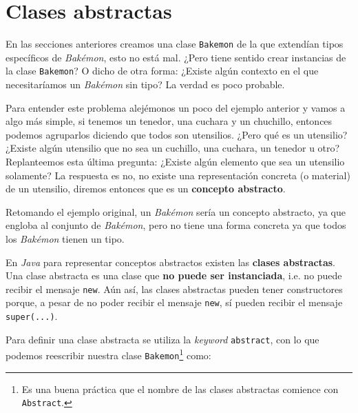 \section{Clases abstractas}
  En las secciones anteriores creamos una clase \texttt{Bakemon} de la que extendían tipos 
  específicos de \textit{Bakémon}, esto no está mal.
  ¿Pero tiene sentido crear instancias de la clase \texttt{Bakemon}?
  O dicho de otra forma: ¿Existe algún contexto en el que necesitaríamos un \textit{Bakémon} sin 
  tipo?
  La verdad es poco probable.

  Para entender este problema alejémonos un poco del ejemplo anterior y vamos a algo más simple, si
  tenemos un tenedor, una cuchara y un chuchillo, entonces podemos agruparlos diciendo que todos son 
  utensilios.
  ¿Pero qué es un utensilio?
  ¿Existe algún utensilio que no sea un cuchillo, una cuchara, un tenedor u otro?
  Replanteemos esta última pregunta: ¿Existe algún elemento que sea un utensilio solamente?
  La respuesta es no, no existe una representación concreta (o material) de un utensilio, diremos
  entonces que es un \textbf{concepto abstracto}.

  Retomando el ejemplo original, un \textit{Bakémon} sería un concepto abstracto, ya que engloba al
  conjunto de \textit{Bakémon}, pero no tiene una forma concreta ya que todos los \textit{Bakémon}
  tienen un tipo.

  En \textit{Java} para representar conceptos abstractos existen las \textbf{clases abstractas}.
  Una clase abstracta es una clase que \textbf{no puede ser instanciada}, i.e. no puede recibir el
  mensaje \texttt{new}.
  Aún así, las clases abstractas pueden tener constructores porque, a pesar de no poder recibir el
  mensaje \texttt{new}, sí pueden recibir el mensaje \texttt{super(...)}.

  Para definir una clase abstracta se utiliza la \textit{keyword} \texttt{abstract}, con
  lo que podemos reescribir nuestra clase \texttt{Bakemon}\footnote{Es una buena práctica que el 
  nombre de las clases abstractas comience con \texttt{Abstract}.} como:

